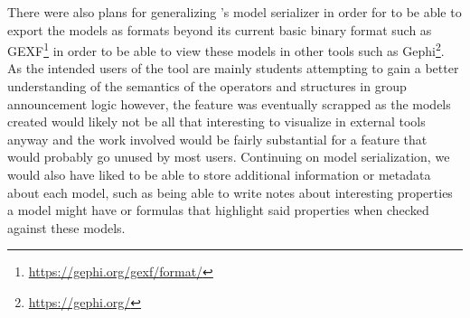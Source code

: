 There were also plans for generalizing \cname{}'s  model serializer in order for to be able to export the models as formats beyond its current basic binary format such as GEXF\footnote{\url{https://gephi.org/gexf/format/}} in order to be able to view these models in other tools such as Gephi\footnote{\url{https://gephi.org/}}. As the intended users of the tool are mainly students attempting to gain a better understanding of the semantics of the operators and structures in group announcement logic however, the feature was eventually scrapped as the models created would likely not be all that interesting to visualize in external tools anyway and the work involved would be fairly substantial for a feature that would probably go unused by most users.  Continuing on model serialization, we would also have liked to be able to store additional information or metadata about each model, such as being able to write notes about interesting properties a model might have or formulas that highlight said properties when checked against these models. 

